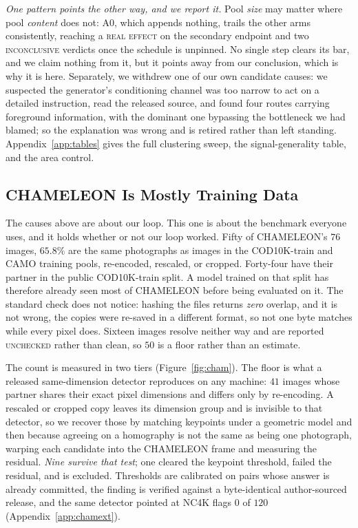\documentclass{article}
\begin{document}
\textit{One pattern points the other way, and we report it.} Pool \emph{size} may matter where pool
\emph{content} does not: A0, which appends nothing, trails the other arms consistently, reaching a
\textsc{real effect} on the secondary endpoint and two \textsc{inconclusive} verdicts once the
schedule is unpinned. No single step clears its bar, and we claim nothing from it, but it points away
from our conclusion, which is why it is here. Separately, we withdrew one of our own candidate
causes: we suspected the generator's conditioning channel was too narrow to act on a detailed
instruction, read the released source, and found four routes carrying foreground information, with
the dominant one bypassing the bottleneck we had blamed; so the explanation was wrong and is
retired rather than left standing. Appendix~\ref{app:tables} gives the full clustering sweep, the
signal-generality table, and the area control.

\subsection{CHAMELEON Is Mostly Training Data}
\label{sec:contamination}
The causes above are about our loop. This one is about the benchmark everyone uses, and it holds
whether or not our loop worked. Fifty of CHAMELEON's $76$ images, $65.8\%$ are the same photographs as images in the
COD10K-train and CAMO training pools, re-encoded, rescaled, or cropped. Forty-four have their
partner in the public COD10K-train split. A model trained on that split has therefore already seen
most of CHAMELEON before being evaluated on it. The standard check does not notice: hashing the
files returns \emph{zero} overlap, and it is not wrong, the copies were re-saved in a different
format, so not one byte matches while every pixel does. Sixteen images resolve neither way and are
reported \textsc{unchecked} rather than clean, so $50$ is a floor rather than an estimate.

The count is measured in two tiers (Figure~\ref{fig:cham}). The floor is what a released
same-dimension detector reproduces on any machine: $41$ images whose partner shares their exact
pixel dimensions and differs only by re-encoding. A rescaled or cropped copy leaves its dimension
group and is invisible to that detector, so we recover those by matching keypoints under a geometric
model and then because agreeing on a homography is not the same as being one photograph, warping each candidate into the CHAMELEON frame and measuring the residual. \textit{Nine survive that test}; one cleared the keypoint threshold, failed the residual, and is excluded. Thresholds are calibrated on pairs whose answer is already committed, the finding is verified against a
byte-identical author-sourced release, and the same detector pointed at NC4K flags $0$ of $120$ (Appendix~\ref{app:chamext}).
\end{document}

